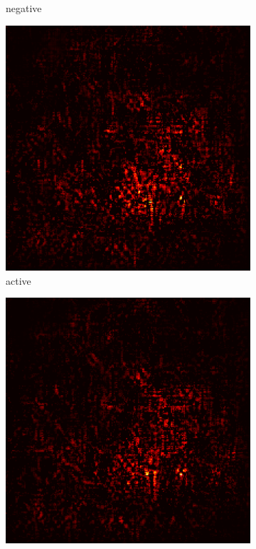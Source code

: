 \documentclass[preprint,12pt]{elsarticle}
\begin{document}
\begin{figure}
\begin{subfigure}{0.14\textwidth}
        \caption{negative}
    \end{subfigure}
    \hfill
    \begin{subfigure}{0.14\textwidth}
        \centering
        \includegraphics[width=\linewidth]{../visualizations/examples/imagenette/resnet18/active_saliency_map/1.png}
        \caption{active}
    \end{subfigure}
    \hfill
    \begin{subfigure}{0.14\textwidth}
        \centering
        \includegraphics[width=\linewidth]{../visualizations/examples/imagenette/resnet18/inactive_saliency_map/1.png}

\end{subfigure}
\end{figure}
\end{document}
